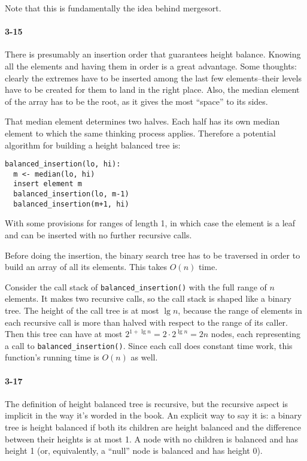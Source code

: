 \documentclass{report}
\begin{document}
Note that this is fundamentally the idea behind mergesort.

\paragraph{3-15} There is presumably an insertion order that guarantees height balance. Knowing all the elements and having them in order is a great advantage. Some thoughts: clearly the extremes have to be inserted among the last few elements--their levels have to be created for them to land in the right place. Also, the median element of the array has to be the root, as it gives the most ``space'' to its sides.

That median element determines two halves. Each half has its own median element to which the same thinking process applies. Therefore a potential algorithm for building a height balanced tree is:
\begin{lstlisting}
balanced_insertion(lo, hi):
  m <- median(lo, hi)
  insert element m
  balanced_insertion(lo, m-1)
  balanced_insertion(m+1, hi)
\end{lstlisting}
With some provisions for ranges of length 1, in which case the element is a leaf and can be inserted with no further recursive calls.

Before doing the insertion, the binary search tree has to be traversed in order to build an array of all its elements. This takes $O(n)$ time.

Consider the call stack of \lstinline!balanced_insertion()! with the full range of $n$ elements. It makes two recursive calls, so the call stack is shaped like a binary tree. The height of the call tree is at most $\lg n$, because the range of elements in each recursive call is more than halved with respect to the range of its caller. Then this tree can have at most $2^{1+\lg n} = 2\cdot 2^{\lg n} = 2n$ nodes, each representing a call to \lstinline!balanced_insertion()!. Since each call does constant time work, this function's running time is $O(n)$ as well.

\paragraph{3-17} The definition of height balanced tree is recursive, but the recursive aspect is implicit in the way it's worded in the book. An explicit way to say it is: a binary tree is height balanced if both its children are height balanced and the difference between their heights is at most 1. A node with no children is balanced and has height 1 (or, equivalently, a ``null'' node is balanced and has height 0).
\end{document}
